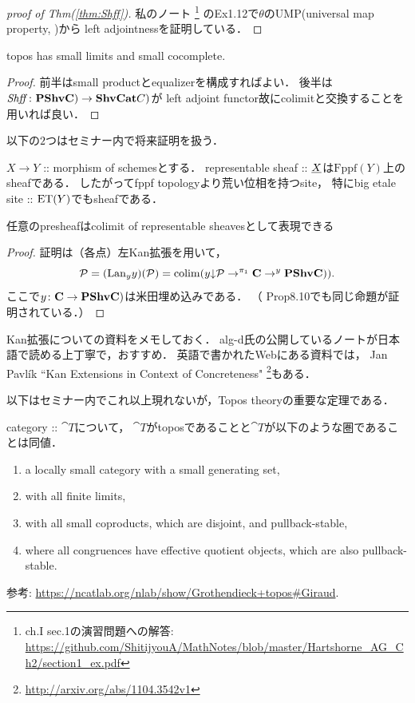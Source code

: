 \begin{proof}[proof of Thm(\ref{thm:Shff})]
    私のノート
    \footnote{\cite{HarAG} ch.I sec.1の演習問題への解答: 
        \url{https://github.com/ShitijyouA/MathNotes/blob/master/Hartshorne_AG_Ch2/section1_ex.pdf}}
    のEx1.12で$\theta$のUMP(universal map property, \cite{Awodey})から
    left adjointnessを証明している．
\end{proof}

\begin{Prop}
    topos has small limits and small cocomplete.
\end{Prop}
\begin{proof}
    前半はsmall productとequalizerを構成すればよい．
    後半は$\mathit{Shff} \colon \mathbf{PShv}\mathbf{C}) \to \mathbf{Shv}\mathbf{Cat}{C})$が
    left adjoint functor故にcolimitと交換することを用いれば良い．
\end{proof}

以下の$2$つはセミナー内で将来証明を扱う．
\begin{Thm}
    $X \to Y$ :: morphism of schemesとする．
    representable sheaf :: $\underline{X}$は$\mathrm{Fppf}(Y)$上のsheafである．
    したがってfppf topologyより荒い位相を持つsite，
    特にbig etale site :: $\mathrm{ET}(Y)$でもsheafである．
\end{Thm}

\begin{Prop}
    任意のpresheafはcolimit of representable sheavesとして表現できる
\end{Prop}
\begin{proof}
    証明は（各点）左Kan拡張を用いて，
    \[ \mathcal{P}=(\mathrm{Lan}_{y}y)(\mathcal{P})=\operatorname*{colim}(y{\downarrow}\mathcal{P} \to^{\pi_1} \mathbf{C} \to^{y} \mathbf{PShv}\mathbf{C})). \]
    ここで$y \colon \mathbf{C} \to \mathbf{PShv}\mathbf{C})$は米田埋め込みである．
    （\cite{Awodey} Prop8.10でも同じ命題が証明されている．）
\end{proof}

\begin{Remark}
    Kan拡張についての資料をメモしておく．
    alg-d氏の公開しているノートが日本語で読める上丁寧で，おすすめ．
    英語で書かれたWebにある資料では，
    Jan Pavl\'ik ``Kan Extensions in Context of Concreteness"
    \footnote{ \url{http://arxiv.org/abs/1104.3542v1} }もある．
\end{Remark}

以下はセミナー内でこれ以上現れないが，Topos theoryの重要な定理である．
\begin{Thm}
    category :: $\cat{T}$について，
    $\cat{T}$がtoposであることと$\cat{T}$が以下のような圏であることは同値．
    \begin{enumerate}[label=(G\arabic*)]
        \item a locally small category with a small generating set,
        \item with all finite limits,
        \item with all small coproducts, which are disjoint, and pullback-stable,
        \item where all congruences have effective quotient objects, which are also pullback-stable.
    \end{enumerate}
    参考: \url{https://ncatlab.org/nlab/show/Grothendieck+topos#Giraud}.
\end{Thm}

